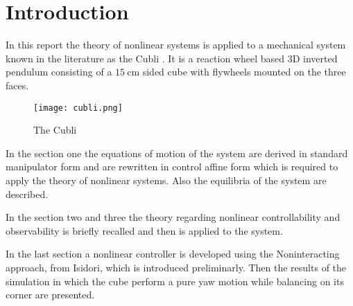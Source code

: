 \section*{Introduction}
In this report the theory of nonlinear systems is applied to a mechanical system known in the literature
as the Cubli \cite{Gajamohan2013}. It is a reaction wheel based 3D inverted pendulum consisting of a $\SI{15}{\centi\meter}$
sided cube with flywheels mounted on the three faces.
\begin{figure}[h]
  \centering
  \texttt{[image: cubli.png]}
  \caption{The Cubli}
\end{figure}
\par
In the section one the equations of motion of the system are derived in standard manipulator form and are rewritten
in control affine form which is required to apply the theory of nonlinear systems. Also the equilibria of the system
are described.
\par
In the section two and three the theory regarding nonlinear controllability and observability is briefly recalled
and then is applied to the system.
\par
In the last section a nonlinear controller is developed using the Noninteracting approach, from Isidori, which is
introduced preliminarly. Then the results of the simulation in which the cube perform a pure yaw motion while balancing
on its corner are presented.

\newpage
